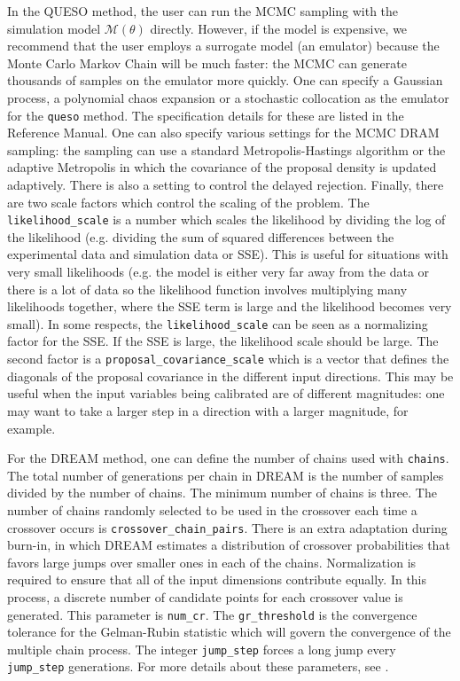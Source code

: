 In the QUESO method, the user can run the MCMC sampling with 
the simulation model $\mathcal{M}(\theta)$ directly. However, 
if the model is expensive, we recommend that the user employs 
a surrogate model (an emulator) because the Monte Carlo Markov Chain 
will be much faster:  the MCMC can generate thousands of samples 
on the emulator more quickly. One can specify a Gaussian process,
a polynomial chaos expansion or a stochastic collocation 
as the emulator for the \texttt{queso} method. The specification 
details for these are listed in the Reference Manual. 
One can also specify various settings for the MCMC DRAM sampling: 
the sampling can use a standard Metropolis-Hastings algorithm 
or the adaptive Metropolis in which the covariance of the proposal 
density is updated adaptively. There is also a setting to control 
the delayed rejection. Finally, there are two scale factors 
which control the scaling of the problem. The 
\texttt{likelihood\_scale} is a number 
which scales the likelihood by dividing
the log of the likelihood (e.g. dividing the sum of squared differences
between the experimental data and simulation data or SSE).  This
is useful for situations with very small likelihoods (e.g. the model is either
very far away from the data or there is a lot of data so the likelihood function
involves multiplying many likelihoods together, where the SSE term is large
and the likelihood becomes very small).
In some respects, the \texttt{likelihood\_scale} can be seen as a normalizing factor
for the SSE.  If the SSE is large, the likelihood scale should be large.
The second factor is a \texttt{proposal\_covariance\_scale} 
which is a vector that defines the diagonals of the proposal covariance
in the different input directions. This may be useful when the 
input variables being calibrated are of different magnitudes:  
one may want to take a larger step in a direction
with a larger magnitude, for example.
    
For the DREAM method, one can define the number of chains used with
\texttt{chains}.  The total number of generations per chain in DREAM is
the number of samples divided by the number of chains.
The minimum number of chains is three.
The number of chains randomly selected to be used in the crossover
each time a crossover occurs is \texttt{crossover\_chain\_pairs}.
There is an extra adaptation during burn-in, in which DREAM estimates a
distribution of crossover probabilities that favors large jumps over
smaller ones in each of the chains.
Normalization is required to ensure that all of the input dimensions contribute
equally.  In this process, a discrete number of candidate points for
each crossover value is generated.  This parameter is \texttt{num\_cr}.
The \texttt{gr\_threshold} is the convergence tolerance for the Gelman-Rubin
statistic which will govern the convergence of the multiple chain
process.  The integer \texttt{jump\_step} forces a long jump every 
\texttt{jump\_step} generations.
For more details about these parameters, see \cite{Vrugt}. 

